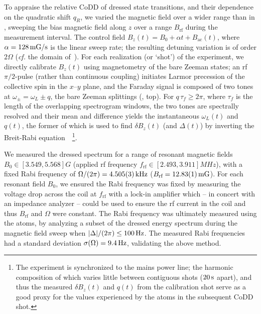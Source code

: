 \documentclass[aps,prl,reprint,superscriptaddress,floatfix]{revtex4-1}
\begin{document}
To appraise the relative CoDD of dressed state transitions, and their dependence on the quadratic shift $q_R$, 
we varied the magnetic field over a wider range than in , sweeping the bias magnetic field along $z$ over a range $B_{\text{rf}}$ during the measurement interval.
The control field $B_z(t) = B_0 + \alpha t + B_{\text{ac}}(t)$, where $\alpha = \unit[128]{mG/s}$ is the linear sweep rate; the resulting detuning variation is of order $2\Omega$ (\textit{cf.} the domain of~).
For each realization (or `shot') of the experiment, we directly calibrate $B_z(t)$ using magnetometry of the bare Zeeman states; an rf $\pi/2$-pulse (rather than continuous coupling) initiates Larmor precession of the collective spin in the $x$--$y$ plane, and the Faraday signal is composed of two tones at $\omega_\pm = \omega_L \pm q$, the bare Zeeman splittings (, top).
For $q \, \tau_f \geq 2\pi$, where $\tau_f$ is the length of the overlapping spectrogram windows, the two tones are spectrally resolved and their mean and difference yields the instantaneous $\omega_L(t)$ and $q(t)$, the former of which is used to find $\delta B_z(t)$ (and $\Delta(t)$) by inverting the Breit-Rabi equation~\cite{ramsey_molecular_1956}~\footnote{
    The experiment is synchronized to the mains power line; the harmonic composition of which varies little between contiguous shots ($\unit[20]{s}$ apart), and thus the measured $\delta B_z(t)$ and $q(t)$ from the calibration  shot serve as a good proxy for the values experienced by the atoms in the subsequent CoDD shot.
}.

We measured the dressed spectrum for a range of resonant magnetic fields $B_0 \in [3.549, 5.568]\unit{G}$ (applied rf frequency $f_{\text{rf}} \in [2.493, 3.911]\unit{MHz}$), with a fixed Rabi frequency of $\Omega/(2\pi) = \unit[4.505(3)]{kHz}$ ($B_{\text{rf}} = \unit[12.83(1)]{mG}$).
For each resonant field $B_0$, we ensured the Rabi frequency was fixed by measuring the voltage drop across the coil at $f_{\text{rf}}$ with a lock-in amplifier which -- in concert with an impedance analyzer -- could be used to ensure the rf current in the coil and thus $B_{\text{rf}}$ and $\Omega$ were constant.
The Rabi frequency was ultimately measured using the atoms, by analyzing a subset of the dressed energy spectrum during the magnetic field sweep when $\abs{\Delta}/(2\pi) \leq \unit[100]{Hz}$.
The measured Rabi frequencies had a standard deviation $\sigma(\Omega) = \unit[9.4]{Hz}$, validating the above method.
\end{document}
